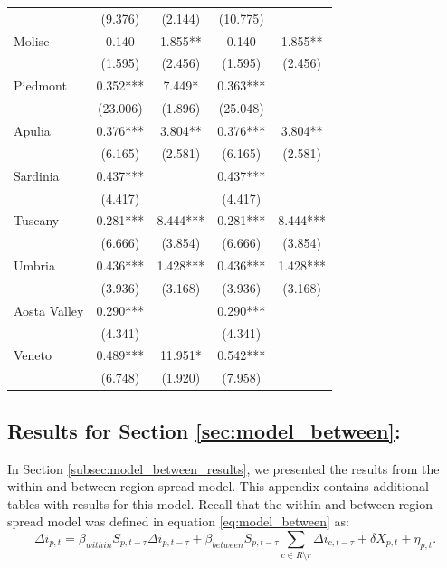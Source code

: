 \documentclass[12pt]{article}
\begin{document}
\begin{appendices}
\begin{longtable}{@{}lcccc@{}}
             & (9.376) & (2.144) & (10.775) &  \\ 
            Molise & 0.140 & 1.855** & 0.140 & 1.855** \\ 
             & (1.595) & (2.456) & (1.595) & (2.456) \\ 
            Piedmont & 0.352*** & 7.449* & 0.363*** &  \\ 
             & (23.006) & (1.896) & (25.048) &  \\ 
            Apulia & 0.376*** & 3.804** & 0.376*** & 3.804** \\ 
             & (6.165) & (2.581) & (6.165) & (2.581) \\ 
            Sardinia & 0.437*** &  & 0.437*** &  \\ 
             & (4.417) &  & (4.417) &  \\ 
            Tuscany & 0.281*** & 8.444*** & 0.281*** & 8.444*** \\ 
             & (6.666) & (3.854) & (6.666) & (3.854) \\ 
            Umbria & 0.436*** & 1.428*** & 0.436*** & 1.428*** \\ 
             & (3.936) & (3.168) & (3.936) & (3.168) \\ 
            Aosta Valley & 0.290*** &  & 0.290*** & \\ 
             & (4.341) &  & (4.341) &  \\ 
            Veneto & 0.489*** & 11.951* & 0.542*** &  \\ 
             & (6.748) & (1.920) & (7.958) &  \\* \bottomrule
        \end{longtable}
		
		\subsection{Results for Section \ref{sec:model_between}: } \label{sapp:model_between_results}
		In Section \ref{subsec:model_between_results}, we presented the results from the within and between-region spread model. This appendix contains additional tables with results for this model. Recall that the within and between-region spread model was defined in equation \eqref{eq:model_between} as:
		    \begin{equation*}
        		\Delta i_{p,t} = \beta_{within}S_{p,t-\tau}\Delta i_{p,t-\tau} + \beta_{between}S_{p,t-\tau}\sum_{c \in R \setminus r} \Delta i_{c, t-\tau} + \delta X_{p,t} + \eta_{p,t}.
        	\end{equation*}
        

\end{appendices}
\end{document}
